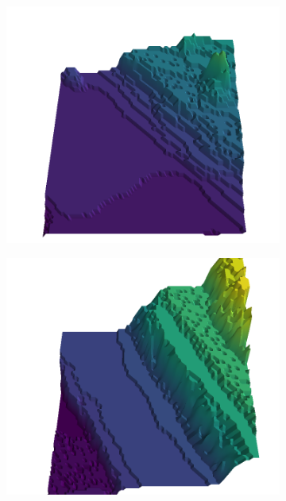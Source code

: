 \begin{figure}[H]
    \begin{subfigure}[b]{0.19\textwidth}
        \includegraphics[width=\linewidth]{../img/5/quarry/worst//patch-3d-majavi-colormap-0.png}
    \end{subfigure}
    \begin{subfigure}[b]{0.19\textwidth}
        \includegraphics[width=\linewidth]{../img/5/quarry/worst//patch-3d-majavi-colormap-1.png}
    \end{subfigure}  

\end{figure}
